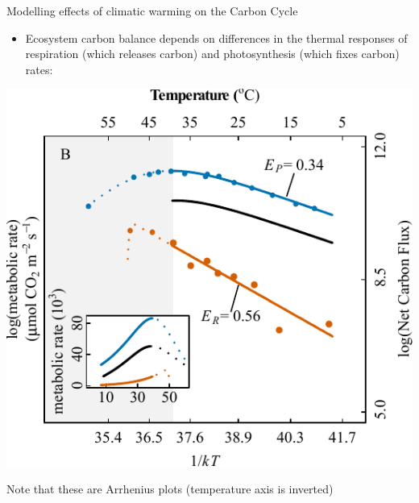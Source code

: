 \documentclass[xcolor={usenames,x11names},compress]{beamer}
\renewcommand{\(}{\begin{columns}}
\renewcommand{\)}{\end{columns}}
\newcommand{\<}[1]{\begin{column}{#1}}
\renewcommand{\>}{\end{column}}
\begin{document}
\begin{frame}{Modelling effects of climatic warming on the Carbon Cycle}
  \begin{itemize}
			\item Ecosystem carbon balance depends on differences in the 
			thermal responses of respiration (which releases carbon) and 
			photosynthesis (which fixes carbon) rates:
  \end{itemize}

  \begin{center} \it
    \includegraphics[width=.45\textwidth]{Fig1_IntraspPlotsTerAqInv.pdf}

\pause 
Note that these are Arrhenius plots (temperature axis is inverted)
\end{center}

\end{frame}
\end{document}
